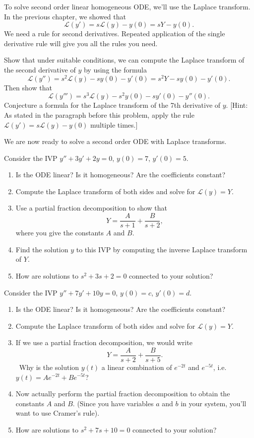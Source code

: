 To solve second order linear homogeneous ODE, we'll use the Laplace transform.  In the previous chapter, we showed that 
$$\mathscr{L}(y') = s\mathscr{L}(y)-y(0) = sY-y(0).$$
We need a rule for second derivatives. Repeated application of the single derivative rule will give you all the rules you need. 
\begin{problem}
 Show that under suitable conditions, we can compute the Laplace transform of the second derivative of $y$ by using the formula
 $$\mathscr{L}(y'')=s^2\mathscr{L}(y)-sy(0)-y'(0) = s^2Y-sy(0)-y'(0).$$
 Then show that 
 $$\mathscr{L}(y''')=s^3\mathscr{L}(y)-s^2y(0)-sy'(0)-y''(0).$$
 Conjecture a formula for the Laplace transform of the 7th derivative of $y$.
 [Hint: As stated in the paragraph before this problem, apply the rule $\mathscr{L}(y') = s\mathscr{L}(y)-y(0)$ multiple times.]
\end{problem}

We are now ready to solve a second order ODE with Laplace transforms.
\begin{problem}
 Consider the IVP $y''+3y'+2y=0$, $y(0)=7$, $y'(0)=5$. 
\begin{enumerate}
 \item Is the ODE linear? Is it homogeneous? Are the coefficients constant?
 \item Compute the Laplace transform of both sides and solve for $\mathscr{L}(y) = Y$.
 \item Use a partial fraction decomposition to show that $$Y=\frac{A}{s+1}+\frac{B}{s+2},$$
where you give the constants $A$ and $B$.
 \item Find the solution $y$ to this IVP by computing the inverse Laplace transform of $Y$.
 \item How are solutions to $s^2+3s+2=0$ connected to your solution?  
\end{enumerate}
\end{problem}

\begin{problem}
 Consider the IVP $y''+7y'+10y=0$, $y(0)=c$, $y'(0)=d$. 
 \begin{enumerate}
 \item Is the ODE linear? Is it homogeneous? Are the coefficients constant?
 \item Compute the Laplace transform of both sides and solve for $\mathscr{L}(y) = Y$.
 \item If we use a partial fraction decomposition, we would write $$Y=\frac{A}{s+2}+\frac{B}{s+5}.$$\
 Why is the solution $y(t)$ a linear combination of $e^{-2t}$ and $e^{-5t}$, i.e. $y(t)=Ae^{-2t}+Be^{-5t}$?
 \item Now actually perform the partial fraction decomposition to obtain the constants $A$ and $B$. (Since you have variables $a$ and $b$ in your system, you'll want to use Cramer's rule).
 \item How are solutions to $s^2+7s+10=0$ connected to your solution?  
\end{enumerate}
\end{problem}

